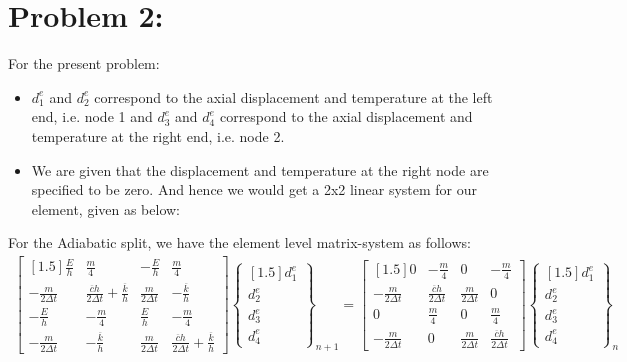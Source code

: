 \section*{Problem 2: }
For the present problem: 
\begin{itemize}
\item $d^e_1$ and $d^e_2$ correspond to the axial displacement and temperature at the left end, i.e. node 1 and $d^e_3$ and $d^e_4$ correspond to the axial displacement and temperature at the right end, i.e. node 2. 
\item We are given that the displacement and temperature at the right node are specified to be zero. And hence we would get a 2x2 linear system for our element, given as below:
\end{itemize}
For the Adiabatic split, we have the element level matrix-system as follows: 
\begin{align*}
\begin{bmatrix}[1.5]
\frac{E}{h} & \frac{m}{4} & -\frac{E}{h} & \frac{m}{4}\\
-\frac{m}{2\Delta t} & \frac{\overline{c}h}{2\Delta t}+ \frac{\overline{k}}{h} & \frac{m}{2\Delta t} & -\frac{\overline{k}}{h} \\
-\frac{E}{h} & -\frac{m}{4} & \frac{E}{h} & -\frac{m}{4} \\
- \frac{m}{2\Delta t} & - \frac{\overline{k}}{h} & \frac{m}{2\Delta t} & \frac{\overline{c}h}{2\Delta t}+ \frac{\overline{k}}{h}
\end{bmatrix}
\begin{Bmatrix}[1.5]
d^e_1\\d^e_2\\d^e_3\\d^e_4
\end{Bmatrix}_{n+1}
= 
\begin{bmatrix}[1.5]
0 & -\frac{m}{4} & 0 & -\frac{m}{4}\\
-\frac{m}{2\Delta t} & \frac{\overline{c}h}{2\Delta t} & \frac{m}{2\Delta t} & 0 \\
0 & \frac{m}{4} & 0 & \frac{m}{4}\\
- \frac{m}{2\Delta t} & 0 &  \frac{m}{2\Delta t} & \frac{\overline{c}h}{2\Delta t}
\end{bmatrix} 
\begin{Bmatrix}[1.5]
d^e_1\\d^e_2\\d^e_3\\d^e_4
\end{Bmatrix}_{n}
\end{align*}

